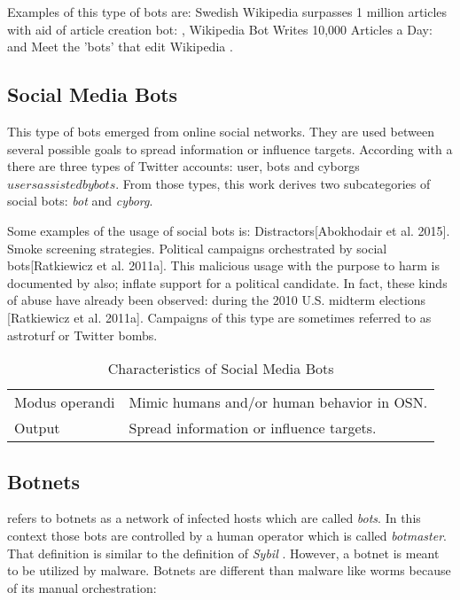 \documentclass[twoside]{article}
\begin{document}
\begin{multicols}{2}
        
    Examples of this type of bots are:
    Swedish Wikipedia surpasses 1 million articles with aid of article creation bot: \cite{guld:2013}, Wikipedia Bot Writes 10,000 Articles
    a Day: \cite{wikiWriter:2014} and Meet the 'bots' that edit Wikipedia \cite{bbc07:2012}.
    

\subsection{Social Media Bots}
    This type of bots emerged from online social networks. They are used between several possible goals to spread information or influence
    targets. According with \cite{wagner2012social} a there are three types of Twitter accounts: user, bots and cyborgs\(users assisted by bots\). 
    From those types, this work derives two subcategories of social bots: \emph{bot} and \emph{cyborg}.
    
    Some examples of the usage of social bots is: Distractors[Abokhodair et al. 2015]. Smoke screening strategies. Political campaigns 
    orchestrated by social bots[Ratkiewicz et al. 2011a]. This malicious usage with the purpose to harm is documented by \cite{ferrara:2015} also; 
    inflate support for a political candidate. In fact, these kinds of abuse have already been observed: during the 2010 U.S. midterm elections 
    [Ratkiewicz et al. 2011a]. Campaigns of this type are sometimes referred to as astroturf or Twitter bombs\cite{ferrara:2015}.
    
    \begin{table}[H]
        \caption{Characteristics of Social Media Bots}
        \begin{tabular}{p{2cm} p{4cm}}
        \toprule
        Modus operandi &  Mimic humans and/or human behavior in OSN. \\ 
        Output                &  Spread information or influence targets. \\
        \bottomrule
        \end{tabular}
        \label{tab:socialb}
    \end{table}
    
    
\subsection{Botnets}
    \cite{abu:2006} refers to botnets as a network of infected hosts which are called \emph{bots}. In this context those bots are controlled by a human
    operator which is called \emph{botmaster}. That definition is similar to the definition of \emph{Sybil} \cite{ferrara:2015}. However, a botnet
    is meant to be utilized by malware. Botnets are different than malware like worms because of its manual orchestration\cite{abu:2006}:
    

\end{multicols}
\end{document}
